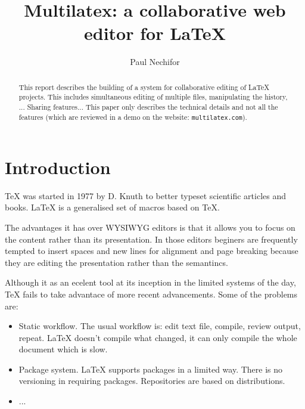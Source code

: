\documentclass{llncs}
\begin{document}
\title{Multilatex: a collaborative web editor for \LaTeX}

\author{Paul Nechifor}


\maketitle

\begin{abstract}

This report describes the building of a system for collaborative editing of \LaTeX{} projects. This includes simultaneous editing of multiple files, manipulating the history, ... Sharing features... This paper only describes the technical details and not all the features (which are reviewed in a demo on the website: \texttt{multilatex.com}).

\end{abstract}

\section{Introduction}

\TeX{} was started in 1977 by D. Knuth to better typeset scientific articles and books. \LaTeX{} is a generalised set of macros based on \TeX{}.

The advantages it has over WYSIWYG editors is that it allows you to focus on the content rather than its presentation. In those editors beginers are frequently tempted to insert spaces and new lines for alignment and page breaking because they are editing the presentation rather than the semantincs.

Although it as an ecelent tool at its inception in the limited systems of the day, \TeX{} fails to take advantace of more recent advancements. Some of the problems are:

\begin{itemize}

\item Static workflow. The usual workflow is: edit text file, compile, review output, repeat. \LaTeX{} doesn't compile what changed, it can only compile the whole document which is slow.

\item Package system. \LaTeX{} supports packages in a limited way. There is no versioning in requiring packages. Repositories are based on distributions.

\item ...

\end{itemize}
\end{document}
